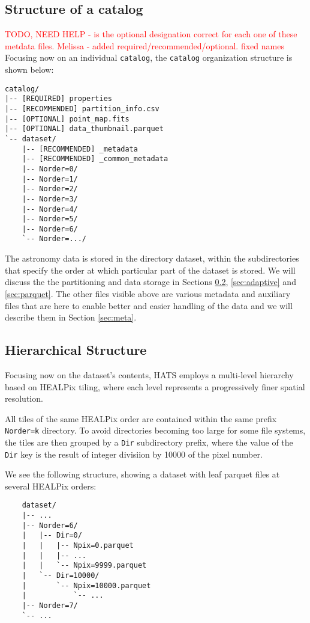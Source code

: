 \documentclass[11pt,a4paper]{ivoa}
\begin{document}
\subsection{Structure of a catalog} \label{sec:catalog}
\textcolor{red}{TODO, NEED HELP - is the optional designation correct for each one of these metdata files. Melissa - added required/recommended/optional. fixed names} Focusing now on an individual  \texttt{catalog}, the  \texttt{catalog} organization structure is shown below:
\begin{verbatim}
catalog/
|-- [REQUIRED] properties
|-- [RECOMMENDED] partition_info.csv
|-- [OPTIONAL] point_map.fits
|-- [OPTIONAL] data_thumbnail.parquet
`-- dataset/
    |-- [RECOMMENDED] _metadata
    |-- [RECOMMENDED] _common_metadata
    |-- Norder=0/
    |-- Norder=1/
    |-- Norder=2/
    |-- Norder=3/
    |-- Norder=4/
    |-- Norder=5/
    |-- Norder=6/
    `-- Norder=.../
\end{verbatim}

The astronomy data is stored in the directory dataset, within the subdirectories that specify the order at which particular part of the dataset is stored. We will discuss the the partitioning and data storage in Sections \ref{sec:hierarchical}, \ref{sec:adaptive} and \ref{sec:parquet}. The other files visible above are various metadata and auxiliary files that are here to enable better and easier handling of the data and we will describe them in Section \ref{sec:meta}. 
    
\subsection{Hierarchical Structure} \label{sec:hierarchical}
Focusing now on the dataset's contents, HATS employs a multi-level hierarchy based on HEALPix tiling, where each level represents a progressively finer spatial resolution.

All tiles of the same HEALPix order are contained within the same prefix \texttt{Norder=k} directory. 
To avoid directories becoming too large for some file systems, the tiles are then grouped by a \texttt{Dir} subdirectory prefix,
where the value of the \texttt{Dir} key is the result of integer divisiion by 10000 of the pixel number.

We see the following structure, showing a dataset with leaf parquet files at several HEALPix orders:
\begin{verbatim}
    dataset/
    |-- ...
    |-- Norder=6/
    |   |-- Dir=0/
    |   |   |-- Npix=0.parquet
    |   |   |-- ...
    |   |   `-- Npix=9999.parquet
    |   `-- Dir=10000/
    |       `-- Npix=10000.parquet
    |           `-- ...
    |-- Norder=7/
    `-- ...
\end{verbatim} 
\end{document}
